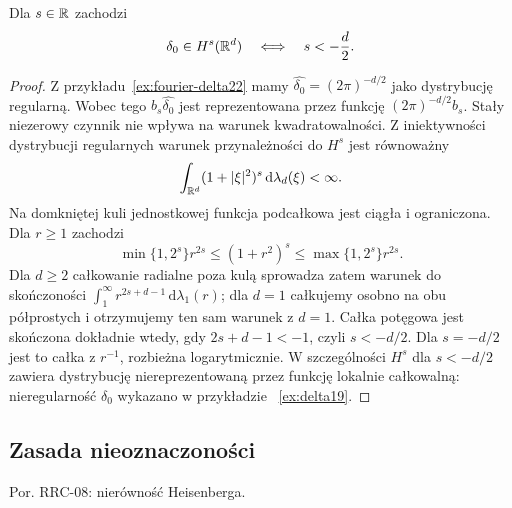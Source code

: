 \begin{wniosek}
\label{cor:dt-delta-Hs}
Dla $s\in\mathbb R$ zachodzi
\[
 \delta_0\in H^s(\mathbb R^d)\quad\Longleftrightarrow\quad
 s<-\frac d2.
\]
\end{wniosek}
\begin{proof}
Z przykładu~\ref{ex:fourier-delta22} mamy
$\widehat{\delta_0}=(2\pi)^{-d/2}$ jako dystrybucję regularną.
Wobec tego $b_s\widehat{\delta_0}$ jest
reprezentowana przez funkcję $(2\pi)^{-d/2}b_s$.
Stały niezerowy czynnik nie wpływa na warunek
kwadratowalności.
Z iniektywności dystrybucji regularnych
warunek przynależności do $H^s$ jest równoważny
\[
 \int_{\mathbb R^d}(1+|\xi|^2)^s\,
 \mathrm d\lambda_d(\xi)<\infty.
\]
Na domkniętej kuli jednostkowej funkcja podcałkowa
jest ciągła i ograniczona. Dla $r\ge1$ zachodzi
\[
 \min\{1,2^s\}r^{2s}\le(1+r^2)^s
 \le\max\{1,2^s\}r^{2s}.
\]
Dla $d\ge2$ całkowanie radialne poza kulą
sprowadza zatem warunek do skończoności
$\int_1^\infty r^{2s+d-1}\,\mathrm d\lambda_1(r)$;
dla $d=1$ całkujemy osobno na obu półprostych
i otrzymujemy ten sam warunek z $d=1$.
Całka potęgowa jest skończona dokładnie wtedy,
gdy $2s+d-1<-1$, czyli $s<-d/2$.
Dla $s=-d/2$ jest to całka z $r^{-1}$,
rozbieżna logarytmicznie. W szczególności
$H^s$ dla $s<-d/2$ zawiera dystrybucję
niereprezentowaną przez funkcję lokalnie całkowalną:
nieregularność $\delta_0$ wykazano w przykładzie
~\ref{ex:delta19}.
\end{proof}


\subsection{Zasada nieoznaczoności}
\label{sec:dt-uncertainty}
\providecommand{\atlasref}[2]{#2}

Por. \atlasref{PDE-08::thm:pde8-uncertainty}{RRC-08: nierówność Heisenberga}.


